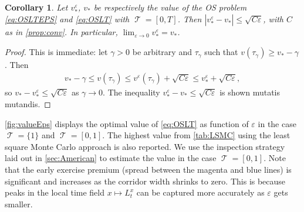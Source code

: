 \documentclass[11pt]{article}
\theoremstyle{plain}
\newtheorem{corollary}{Corollary}
\theoremstyle{definition}
\DeclareMathOperator{\calT}{\mathcal{T}}
\newcommand{\bb}[1]{\textcolor{blue}{#1}}
\begin{document}
\begin{corollary}\label{cor:conv}
   Let $v_*^{\varepsilon}$, $v_{*}$ be respectively the value of  the OS problem \eqref{eq:OSLTEPS} and \eqref{eq:OSLT} with $\calT = [0,T]$. Then 
   $ |v^{\varepsilon}_{*} -  v_*| \le \sqrt{ C \varepsilon}$, with   $C$ as in \cref{prop:conv}. 
   In particular, 
    $\lim_{\varepsilon \to 0} v_*^{\varepsilon} = v_*$. 
\end{corollary}

\begin{proof} This is immediate: 
    let $\gamma>0$ be arbitrary and $\tau_{\gamma}$ such that $v(\tau_{\gamma}) \ge v_{*}-\gamma$. Then 
    \begin{align*}
    v_* -\gamma \le  v(\tau_{\gamma})  \le  v^{\varepsilon}(\tau_{\gamma}) + \sqrt{C\varepsilon} \le v_*^{\varepsilon} + \sqrt{C\varepsilon},
\end{align*}
 so $v_* - v_*^{\varepsilon} \le  \sqrt{C\varepsilon}$ as $\gamma \to 0$. The inequality  $v_*^{\varepsilon} - v_*  \le  \sqrt{C\varepsilon}$ is shown mutatis mutandis. 
\end{proof}

\cref{fig:valueEps} displays %
the optimal value of \eqref{eq:OSLT} as function of $\varepsilon$ in the case $\calT = \{1\}$ %
 and $\calT =[0,1]$. %
 The highest value from \cref{tab:LSMC} using the least square Monte Carlo approach is also reported. We use the inspection strategy laid out in \cref{sec:American}  to estimate  the value in the case  $\calT =[0,1]$. Note that the early exercise premium (spread between the magenta and blue lines) is significant and increases as the corridor width shrinks to zero. %
 This is because %
peaks in the local time field $x\mapsto L_{t}^{x}$ 
can be captured more accurately as $\varepsilon$ gets smaller. %








\end{document}
